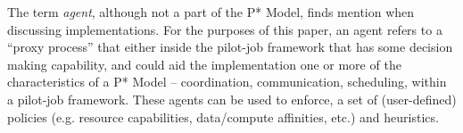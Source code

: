 \documentclass[conference,final]{IEEEtran}
\makeatletter
\def\reduwave{\bgroup \markoverwith{\lower3.5\p@\hbox{\sixly \textcolor{red}{\char58}}}\ULon}
\newcommand{\jwave}[1]{ {\reduwave{#1}}}
\newcommand{\jhanote}[1]{ {\textcolor{red} { ***shantenu: #1 }}}
\newcommand{\alnote}[1]{ {\textcolor{blue} { ***andre: #1 }}}
\newcommand{\jwave}[1]{#1}
\newcommand{\alnote}[1]{}
\newcommand{\jhanote}[1]{}
\makeatother
\begin{document}

The term {\it agent}, although not a part of the P* Model, finds
mention when discussing implementations. For the purposes of this
paper, an agent refers to a ``proxy process'' that either inside the
pilot-job framework that has some decision making capability, and
could aid the implementation one or more of the characteristics of a
P* Model -- coordination, communication, scheduling, within a
pilot-job framework.  These agents can be used to enforce, a set of
(user-defined) policies (e.g.  resource capabilities, data/compute
affinities, etc.) and heuristics.

 


\end{document}
